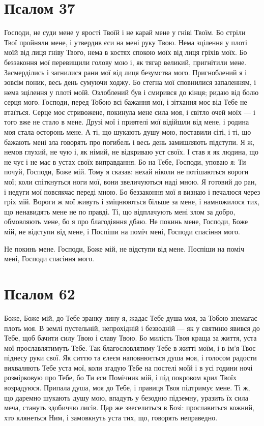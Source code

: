 \documentclass[chapters.tex]{subfiles}
\begin{document}
\section{Псалом 37}
Господи, не суди мене у ярості Твоїй і не карай мене у гніві Твоїм. Бо стріли Твої пройняли мене, і утвердив єси на мені руку Твою. Нема зцілення у плоті моїй від лиця гніву Твого, нема в костях спокою моїх від лиця гріхів моїх. Бо беззаконня мої перевищили голову мою і, як тягар великий, пригнітили мене. Засмерділись і загнилися рани мої від лиця безумства мого. Пригноблений я і зовсім поник, весь день сумуючи ходжу. Бо стегна мої сповнилися запаленням, і нема зцілення у плоті моїй. Озлоблений був і смирився до кінця; ридаю від болю серця мого. Господи, перед Тобою всі бажання мої, і зітхання моє від Тебе не втаїться. Серце моє стривожене, покинула мене сила моя, і світло очей моїх — і того вже не стало в мене. Друзі мої і приятелі мої відійшли від мене, і родина моя стала осторонь мене. А ті, що шукають душу мою, поставили сіті, і ті, що бажають мені зла говорять про погибель і весь день замишляють підступи. Я ж, немов глухий, не чую і, як німий, не відкриваю уст своїх. І став я як людина, що не чує і не має в устах своїх виправдання. Бо на Тебе, Господи, уповаю я: Ти почуй, Господи, Боже мій. Тому я сказав: нехай ніколи не потішаються вороги мої; коли спіткнуться ноги мої, вони звеличуються наді мною. Я готовий до ран, і недуги мої повсякчас переді мною. Бо беззаконня мої я визнаю і печалюся через гріх мій. Вороги ж мої живуть і зміцнюються більше за мене, і намножилося тих, що ненавидять мене не по правді. Ті, що відплачують мені злом за добро, обмовляють мене, бо я про благодіяння дбаю. Не покинь мене, Господи, Боже мій, не відступи від мене, і Поспіши на поміч мені, Господи спасіння мого.

Не покинь мене. Господи, Боже мій, не відступи від мене. Поспіши на поміч мені, Господи спасіння мого.

\section{Псалом 62}
Боже, Боже мій, до Тебе зранку лину я, жадає Тебе душа моя, за Тобою знемагає плоть моя. В землі пустельній, непрохідній і безводній — як у святиню явився до Тебе, щоб бачити силу Твою і славу Твою. Бо милість Твоя краща за життя, уста мої прославлятимуть Тебе. Так благословлятиму Тебе в житті моїм, і в ім’я Твоє піднесу руки свої. Як ситтю та єлеєм наповнюється душа моя, і голосом радости вихваляють Тебе уста мої, коли згадую Тебе на постелі моїй і в усі години ночі розмірковую про Тебе, бо Ти єси Помічник мій, і під покровом крил Твоїх возрадуюся. Припала душа, моя до Тебе, і правиця Твоя підтримує мене. Ті ж, що даремно шукають душу мою, впадуть у безодню підземну, уразить їх сила меча, стануть здобиччю лисів. Цар же звеселиться в Бозі: прославиться кожний, хто клянеться Ним, і замовкнуть уста тих, що, говорять неправедно.
\end{document}

